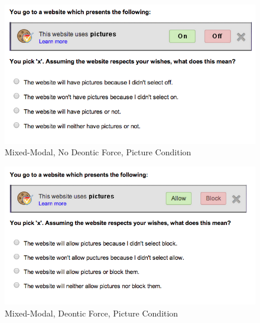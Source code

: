 \begin{figure}[h!]
\centerline{
\includegraphics[scale=.5]{chapter5.tex/dialognocppic}
}
\caption{Mixed-Modal, No Deontic Force, Picture Condition}
\end{figure}


\begin{figure}[h!]
\centerline{
\includegraphics[scale=.5]{chapter5.tex/dialogcppic}
}
\caption{Mixed-Modal, Deontic Force, Picture Condition}
\end{figure}